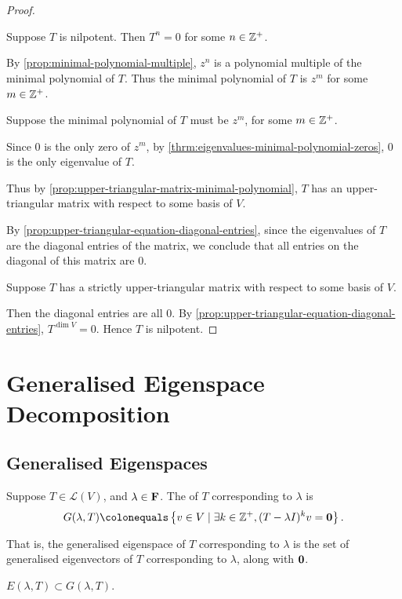 \begin{proof} \

 Suppose $T$ is nilpotent. Then $T^n=0$ for some $n\in\mathbb Z^+$. 

By \ref{prop:minimal-polynomial-multiple}, $z^n$ is a polynomial multiple of the minimal polynomial of $T$.
Thus the minimal polynomial of $T$ is $z^m$ for some $m\in\mathbb Z^+$.

 Suppose the minimal polynomial of $T$ must be $z^m$, for some $m\in\mathbb Z^+$.

Since $0$ is the only zero of $z^m$, by \ref{thrm:eigenvalues-minimal-polynomial-zeros}, $0$ is the only eigenvalue of $T$.

Thus by \ref{prop:upper-triangular-matrix-minimal-polynomial}, $T$ has an upper-triangular matrix with respect to some basis of $V$. 

By \ref{prop:upper-triangular-equation-diagonal-entries}, since the eigenvalues of $T$ are the diagonal entries of the matrix, we conclude that all entries on the diagonal of this matrix are $0$.

 Suppose $T$ has a strictly upper-triangular matrix with respect to some basis of $V$.

Then the diagonal entries are all $0$. By \ref{prop:upper-triangular-equation-diagonal-entries}, $T^{\dim V}=0$. 
Hence $T$ is nilpotent.
\end{proof}
\pagebreak

\section{Generalised Eigenspace Decomposition}
\subsection{Generalised Eigenspaces}
\begin{definition}
Suppose $T\in\mathcal{L}(V)$, and $\lambda\in\mathbf F$. The  of $T$ corresponding to $\lambda$ is
\[G(\lambda,T)\colonequals\crbrac{v\in V\mid\exists k\in\ZZ^+, (T-\lambda I)^k v=\vb{0}}.\]
\end{definition}

That is, the generalised eigenspace of $T$ corresponding to $\lambda$ is the set of generalised eigenvectors of $T$ corresponding to $\lambda$, along with $\vb{0}$.

\begin{remark}
$E(\lambda,T)\subset G(\lambda,T)$.
\end{remark}

